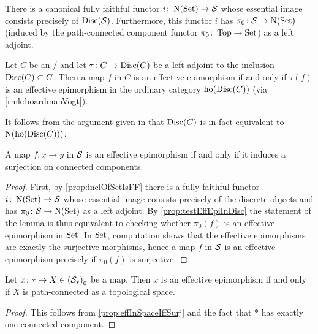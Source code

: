 \begin{prop}\label{prop:inclOfSetIsFF}
    There is a canonical fully faithful functor $i\colon\operatorname{N}(\operatorname{Set})\to\mathcal{S}$ whose essential image consists precisely of $\operatorname{Disc}(\mathcal{S})$.
    Furthermore, this functor $i$ has $\pi_0\colon\mathcal{S}\to\operatorname{N}(\operatorname{Set})$ (induced by the path-connected component functor $\pi_0\colon\operatorname{Top}\to\operatorname{Set}$) as a left adjoint.
    \begin{reference}
        \cite[Proposition 7.8.3]{cisinski_2019}
    \end{reference}
\end{prop}
\begin{prop}\label{prop:testEffEpiInDisc}
    Let $C$ be an \inftytop/ and let $\tau\colon C\to\operatorname{Disc}(C)$ be a left adjoint to the inclusion $\operatorname{Disc}(C)\subset C$.
    Then a map $f$ in $C$ is an effective epimorphism if and only if $\tau(f)$ is an effective epimorphism in the ordinary category $\operatorname{ho}(\operatorname{Disc}(C))$ (via \cref{rmk:boardmanVogt}).
    \begin{reference}
        \cite[Proposition 7.2.1.14]{HTT}
    \end{reference}
\end{prop}
\begin{remark}
    It follows from the argument given in \cite[Notation 5.5.6.2]{HTT} that $\operatorname{Disc}(C)$ is in fact equivalent to $\operatorname{N}(\operatorname{ho}(\operatorname{Disc}(C)))$.
\end{remark}
\begin{prop}\label{prop:effInSpaceIffSurj}
    A map $f\colon x\to y$ in $\mathcal{S}$ is an effective epimorphism if and only if it induces a surjection on connected components.
    \begin{proof}
        First, by \cref{prop:inclOfSetIsFF} there is a fully faithful functor $i\colon\operatorname{N}(\operatorname{Set})\to\mathcal{S}$ whose essential image consists precisely of the discrete objects and has $\pi_0\colon\mathcal{S}\to\operatorname{N}(\operatorname{Set})$ as a left adjoint.
        By \cref{prop:testEffEpiInDisc} the statement of the lemma is thus equivalent to checking whether $\pi_0(f)$ is an effective epimorphism in $\operatorname{Set}$.
        In $\operatorname{Set}$, computation shows that the effective epimorphisms are exactly the surjective morphisms, hence a map $f$ in $\mathcal{S}$ is an effective epimorphism precisely if $\pi_0(f)$ is surjective. %
    \end{proof}
\end{prop}
\begin{corollary}
    Let $x\colon*\to X\in\left(\mathcal{S}_*\right)_0$ be a map.
    Then $x$ is an effective epimorphism if and only if $X$ is path-connected as a topological space.
    \begin{proof}
        This follows from \cref{prop:effInSpaceIffSurj} and the fact that $*$ has exactly one connected component.
    \end{proof}
\end{corollary}